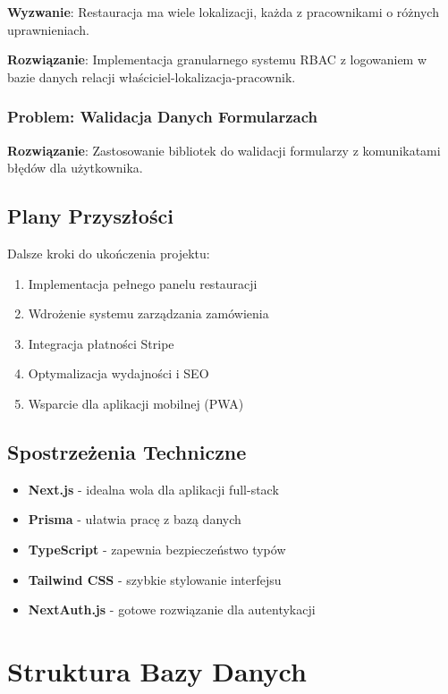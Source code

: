 \documentclass[12pt,a4paper,utf-8]{article}
\begin{document}
\textbf{Wyzwanie}: Restauracja ma wiele lokalizacji, każda z pracownikami o różnych uprawnieniach.

\textbf{Rozwiązanie}: Implementacja granularnego systemu RBAC z logowaniem w bazie danych relacji właściciel-lokalizacja-pracownik.

\subsubsection{Problem: Walidacja Danych Formularzach}

\textbf{Rozwiązanie}: Zastosowanie bibliotek do walidacji formularzy z komunikatami błędów dla użytkownika.

\subsection{Plany Przyszłości}

Dalsze kroki do ukończenia projektu:

\begin{enumerate}
    \item Implementacja pełnego panelu restauracji
    \item Wdrożenie systemu zarządzania zamówienia
    \item Integracja płatności Stripe
    \item Optymalizacja wydajności i SEO
    \item Wsparcie dla aplikacji mobilnej (PWA)
\end{enumerate}

\subsection{Spostrzeżenia Techniczne}

\begin{itemize}
    \item \textbf{Next.js}  -  idealna wola dla aplikacji full-stack
    \item \textbf{Prisma}  -  ułatwia pracę z bazą danych
    \item \textbf{TypeScript}  -  zapewnia bezpieczeństwo typów
    \item \textbf{Tailwind CSS}  -  szybkie stylowanie interfejsu
    \item \textbf{NextAuth.js}  -  gotowe rozwiązanie dla autentykacji
\end{itemize}

\newpage

\section{Struktura Bazy Danych}
\end{document}
